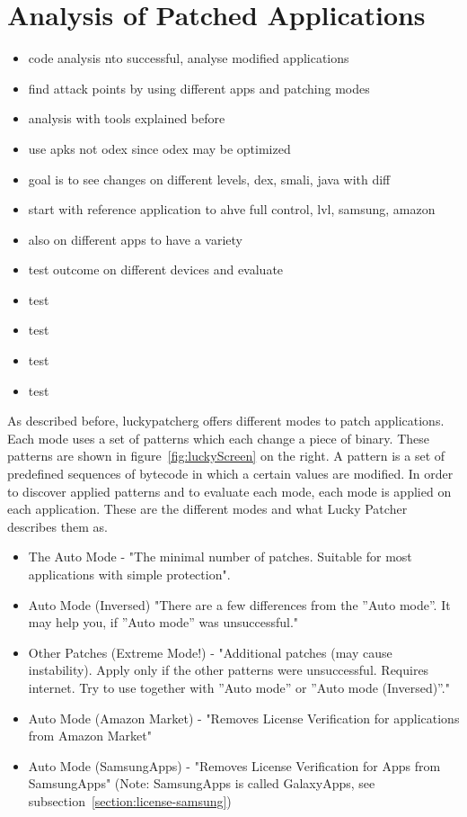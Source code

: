 \section{Analysis of Patched Applications} \label{section:luckypatcher-operation}
\begin{itemize}
  \item code analysis nto successful, analyse modified applications
  \item find attack points by using different apps and patching modes
  \item analysis with tools explained before
  \item use apks not odex since odex may be optimized
  \item goal is to see changes on different levels, dex, smali, java with diff
  \item start with reference application to ahve full control, lvl, samsung, amazon
  \item also on different apps to have a variety
  \item test outcome on different devices and evaluate
  \item test
  \item test
  \item test
  \item test
\end{itemize}
As described before, \gls{luckypatcherg} offers different modes to patch applications.
Each mode uses a set of patterns which each change a piece of binary.
These patterns are shown in figure~\ref{fig:luckyScreen} on the right.
A pattern is a set of predefined sequences of bytecode in which a certain values are modified.
In order to discover applied patterns and to evaluate each mode, each mode is applied on each application.
\newline
These are the different modes and what Lucky Patcher describes them as.
\begin{itemize}
\item The Auto Mode - "The minimal number of patches. Suitable for most applications with simple protection".
\item Auto Mode (Inversed) "There are a few differences from the ”Auto mode”. It may help you, if ”Auto mode” was unsuccessful."
\item Other Patches (Extreme Mode!) - "Additional patches (may cause instability). Apply only if the other patterns were unsuccessful. Requires internet. Try to use together with ”Auto mode” or ”Auto mode (Inversed)”."
\item Auto Mode (Amazon Market) - "Removes License Verification for applications from Amazon Market"
\item Auto Mode (SamsungApps) - "Removes License Verification for Apps from SamsungApps" (Note: SamsungApps is called GalaxyApps, see subsection~\ref{section:license-samsung})
\end{itemize}
